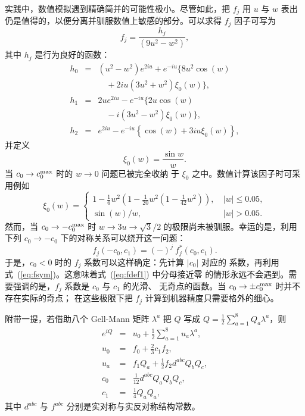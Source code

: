 实践中，数值模拟遇到精确简并的可能性极小。尽管如此，把 $f_j$ 用 $u$
与 $w$ 表出仍是值得的，以便分离并驯服数值上敏感的部分。可以求得 $f_j$
因子可写为
\begin{equation}
   f_j = \frac{h_j}{(9u^2-w^2)},
\label{eq:fdef1}
\end{equation}
其中 $h_j$ 是行为良好的函数：
\begin{eqnarray}
  h_0 &=& (u^2\!-\!w^2)e^{2i u}+e^{-i u}\bigl\{ 8u^2\cos( w)\nonumber\\
  &&\quad + 2iu(3u^2\!+\!w^2)\xi_0( w)\bigr\}, \\
  h_1 &=& 2ue^{2i u}-e^{-i u}\bigl\{ 2u\cos( w) \nonumber\\
  &&\quad - i(3u^2\!-\!w^2)\xi_0( w)\bigr\}, \\
  h_2 &=& e^{2i u}-e^{-i u}\left\{ \cos( w)
  + 3iu\xi_0( w)\right\},
\label{eq:hdef}
\end{eqnarray}
并定义
\begin{equation}
 \xi_0(w) = \frac{\sin w}{w}.
\end{equation}
当 $c_0\rightarrow c_0^{\rm max}$ 时的 $w\rightarrow 0$ 问题已被完全收纳
于 $\xi_0$ 之中。数值计算该因子时可采用例如
\[
 \xi_0(w) = \left\{ \begin{array}{ll}
  1\!-\!\frac{1}{6}w^2\left(1\!-\!\frac{1}{20}w^2
  \left(1\!-\!\frac{1}{42}w^2\right)\right) ,
 & \  \vert w\vert\leq 0.05,\\[2mm]
  \sin(w)/w, & \ \vert w\vert>0.05.
 \end{array}\right.
\]
然而，当 $c_0\rightarrow -c_0^{\rm max}$ 时 $w\rightarrow 3u\rightarrow
\sqrt{3}/2$ 的极限尚未被驯服。幸运的是，利用下列 $c_0\rightarrow -c_0$
下的对称关系可以绕开这一问题：
\begin{equation}
   f_j(-c_0,c_1)=(-)^j\ f_j^\ast(c_0,c_1). \label{eq:fsym}
\end{equation}
于是，$c_0<0$ 时的 $f_j$ 系数可以这样确定：先计算 $\vert c_0\vert$ 对应的
系数，再利用式~(\ref{eq:fsym})。这意味着式~(\ref{eq:fdef1}) 中分母接近零
的情形永远不会遇到。需要强调的是，$f_j$ 系数是 $c_0$ 与 $c_1$ 的光滑、
无奇点的函数。当 $c_0\rightarrow\pm c_0^{\rm max}$ 时并不存在实际的奇点；
在这些极限下把 $f_j$ 计算到机器精度只需要格外的细心。

附带一提，若借助八个 Gell-Mann 矩阵 $\lambda^a$ 把 $Q$ 写成
$Q=\frac{1}{2}\sum_{a=1}^8 Q_a\lambda^a$，则
\begin{eqnarray}
  e^{i Q}&=&u_0+\textstyle\frac{1}{2}\sum_{a=1}^8 u_a \lambda^a,\\
  u_0 &=& f_0+\textstyle\frac{2}{3}c_1f_2,\\
  u_a &=& f_1 Q_a + \textstyle\frac{1}{2} f_2 d^{abc}Q_bQ_c,\\
  c_0 &=& \textstyle\frac{1}{12}d^{abc}Q_a Q_bQ_c,\\
  c_1 &=& \textstyle\frac{1}{4}Q_aQ_a,
\end{eqnarray}
其中 $d^{abc}$ 与 $f^{abc}$ 分别是实对称与实反对称结构常数。
